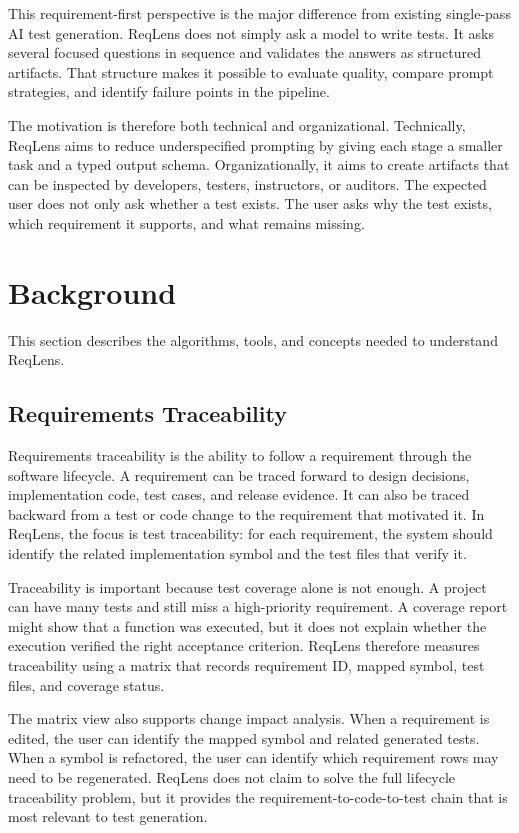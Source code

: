 \documentclass[conference]{IEEEtran}
\begin{document}
This requirement-first perspective is the major difference from existing
single-pass AI test generation. ReqLens does not simply ask a model to write
tests. It asks several focused questions in sequence and validates the answers
as structured artifacts. That structure makes it possible to evaluate quality,
compare prompt strategies, and identify failure points in the pipeline.

The motivation is therefore both technical and organizational. Technically,
ReqLens aims to reduce underspecified prompting by giving each stage a smaller
task and a typed output schema. Organizationally, it aims to create artifacts
that can be inspected by developers, testers, instructors, or auditors. The
expected user does not only ask whether a test exists. The user asks why the
test exists, which requirement it supports, and what remains missing.

\section{Background}
This section describes the algorithms, tools, and concepts needed to
understand ReqLens.

\subsection{Requirements Traceability}
Requirements traceability is the ability to follow a requirement through the
software lifecycle. A requirement can be traced forward to design decisions,
implementation code, test cases, and release evidence. It can also be traced
backward from a test or code change to the requirement that motivated it. In
ReqLens, the focus is test traceability: for each requirement, the system
should identify the related implementation symbol and the test files that
verify it.

Traceability is important because test coverage alone is not enough. A project
can have many tests and still miss a high-priority requirement. A coverage
report might show that a function was executed, but it does not explain whether
the execution verified the right acceptance criterion. ReqLens therefore
measures traceability using a matrix that records requirement ID, mapped symbol,
test files, and coverage status.

The matrix view also supports change impact analysis. When a requirement is
edited, the user can identify the mapped symbol and related generated tests.
When a symbol is refactored, the user can identify which requirement rows may
need to be regenerated. ReqLens does not claim to solve the full lifecycle
traceability problem, but it provides the requirement-to-code-to-test chain
that is most relevant to test generation.
\end{document}
